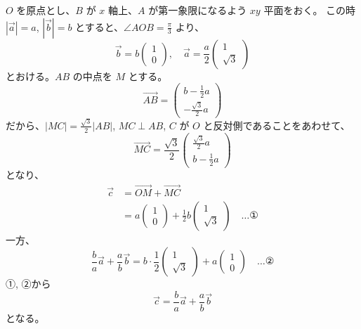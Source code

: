 \documentclass[../main.tex]{subfiles}
\begin{document}
\noindent
[\textbf{解1}] $O$ を原点とし、$B$ が $x$ 軸上、$A$ が第一象限になるよう $xy$ 平面をおく。
この時 $|\vec{a}| = a$, $|\vec{b}| = b$ とすると、$\angle AOB = \frac{\pi}{3}$ より、
\[
  \vec{b} = b
  \begin{pmatrix} 1 \\ 0
  \end{pmatrix}, \quad \vec{a} = \frac{a}{2}
  \begin{pmatrix} 1 \\ \sqrt{3}
  \end{pmatrix}
\]
とおける。$AB$ の中点を $M$ とする。
\[
  \vec{AB} =
  \begin{pmatrix} b - \frac{1}{2}a \\ -\frac{\sqrt{3}}{2}a
  \end{pmatrix}
\]
だから、$|MC| = \frac{\sqrt{3}}{2}|AB|$, $MC \perp AB$, $C$ が $O$ と反対側であることをあわせて、
\[
  \vec{MC} = \frac{\sqrt{3}}{2}
  \begin{pmatrix} \frac{\sqrt{3}}{2}a \\ b - \frac{1}{2}a
  \end{pmatrix}
\]
となり、
\begin{align*}
  \vec{c} &= \vec{OM} + \vec{MC} \\
  &= a
  \begin{pmatrix} 1 \\ 0
  \end{pmatrix} + \frac{1}{2}b
  \begin{pmatrix} 1 \\ \sqrt{3}
  \end{pmatrix} \quad \dots \text{①}
\end{align*}
一方、
\[
  \frac{b}{a}\vec{a} + \frac{a}{b}\vec{b} = b \cdot \frac{1}{2}
  \begin{pmatrix} 1 \\ \sqrt{3}
  \end{pmatrix} + a
  \begin{pmatrix} 1 \\ 0
  \end{pmatrix} \quad \dots \text{②}
\]
①, ②から
\[
  \vec{c} = \frac{b}{a}\vec{a} + \frac{a}{b}\vec{b}
\]
となる。
\end{document}
